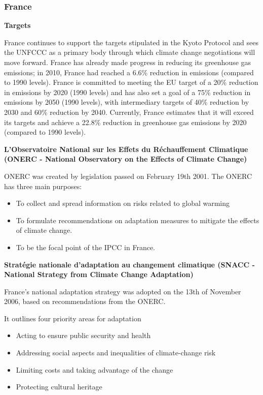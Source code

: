 	\subsubsection{France}
	

\textbf{Targets}



France continues to support the targets stipulated in the Kyoto Protocol and sees the UNFCCC as a primary body through which climate change negotiations will move forward. 
France has already made progress in reducing its greenhouse gas emissions; in 2010, France had reached a 6.6\% reduction in emissions (compared to 1990 levels). 
France is committed to meeting the EU target of a 20\% reduction in emissions by 2020 (1990 levels) and has also set a goal of a 75\% reduction in emissions by 2050 (1990 levels), with intermediary targets of 40\% reduction by 2030 and 60\% reduction by 2040.  
Currently, France estimates that it will exceed its targets and achieve a 22.8\% reduction in greenhouse gas emissions by 2020 (compared to 1990 levels).



\textbf{L’Observatoire National sur les Effets du Réchauffement Climatique (ONERC - National Observatory on the Effects of Climate Change)}



ONERC was created by legislation passed on February 19th 2001. The ONERC has three main purposes:
\begin{itemize}
	\item To collect and spread information on risks related to global warming
	\item To formulate recommendations on adaptation measures to mitigate the effects of climate change.
	\item To be the focal point of the IPCC in France.
\end{itemize}




\textbf{Stratégie nationale d’adaptation au changement climatique (SNACC - National Strategy from Climate Change Adaptation)}



France’s national adaptation strategy was adopted on the 13th of November 2006, based on recommendations from the ONERC. 



It outlines four priority areas for adaptation
\begin{itemize}
	\item Acting to ensure public security and health
	\item Addressing social aspects and inequalities of climate-change risk
	\item Limiting costs and taking advantage of the change
	\item Protecting cultural heritage
\end{itemize}


